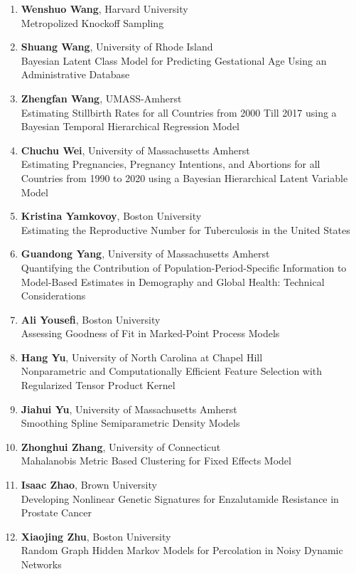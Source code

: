 \begin{enumerate}
\item \textbf{Wenshuo Wang}, Harvard University \\
Metropolized Knockoff Sampling
\item \textbf{Shuang Wang}, University of Rhode Island \\
Bayesian Latent Class Model for Predicting Gestational Age Using an Administrative Database
\item \textbf{Zhengfan Wang}, UMASS-Amherst \\
Estimating Stillbirth Rates for all Countries from 2000 Till 2017 using a Bayesian Temporal Hierarchical Regression Model
\item \textbf{Chuchu Wei}, University of Massachusetts Amherst \\
Estimating Pregnancies, Pregnancy Intentions, and Abortions for all Countries from 1990 to 2020 using a Bayesian Hierarchical Latent Variable Model
\item \textbf{Kristina Yamkovoy}, Boston University \\
Estimating the Reproductive Number for Tuberculosis in the United States
\item \textbf{Guandong Yang}, University of Massachusetts Amherst \\
Quantifying the Contribution of Population-Period-Specific Information to Model-Based Estimates in Demography and Global Health: Technical Considerations
\item \textbf{Ali Yousefi}, Boston University \\
Assessing Goodness of Fit in Marked-Point Process Models
\item \textbf{Hang Yu}, University of North Carolina at Chapel Hill \\
Nonparametric and Computationally Efficient Feature Selection with Regularized Tensor Product Kernel
\item \textbf{Jiahui Yu}, University of Massachusetts Amherst \\
Smoothing Spline Semiparametric Density Models
\item \textbf{Zhonghui Zhang}, University of Connecticut \\
Mahalanobis Metric Based Clustering for Fixed Effects Model
\item \textbf{Isaac Zhao}, Brown University \\
Developing Nonlinear Genetic Signatures for Enzalutamide Resistance in Prostate Cancer
\item \textbf{Xiaojing Zhu}, Boston University \\
Random Graph Hidden Markov Models for Percolation in Noisy Dynamic Networks
\end{enumerate}

